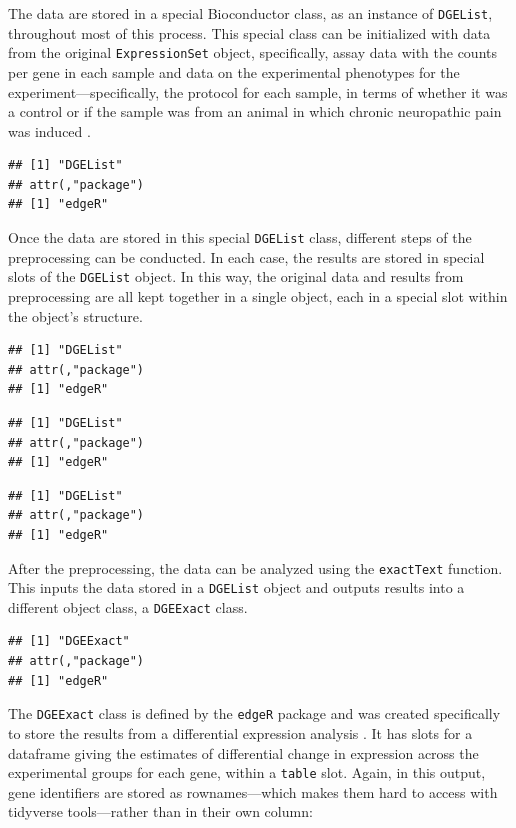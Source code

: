 \documentclass[]{tufte-book}
\begin{document}
The data are stored in a special Bioconductor class, as an instance of
\texttt{DGEList}, throughout most of this process. This special class can be initialized
with data from the original \texttt{ExpressionSet} object, specifically, assay
data with the counts per gene in each sample and data on the experimental
phenotypes for the experiment---specifically, the protocol for each sample,
in terms of whether it was a control or if the sample was from an animal
in which chronic neuropathic pain was induced \citep{hammer2010mrna}.

\begin{verbatim}
## [1] "DGEList"
## attr(,"package")
## [1] "edgeR"
\end{verbatim}

Once the data are stored in this special \texttt{DGEList} class, different
steps of the preprocessing can be conducted. In each case, the results are
stored in special slots of the \texttt{DGEList} object. In this way, the original
data and results from preprocessing are all kept together in a single
object, each in a special slot within the object's structure.

\begin{verbatim}
## [1] "DGEList"
## attr(,"package")
## [1] "edgeR"
\end{verbatim}

\begin{verbatim}
## [1] "DGEList"
## attr(,"package")
## [1] "edgeR"
\end{verbatim}

\begin{verbatim}
## [1] "DGEList"
## attr(,"package")
## [1] "edgeR"
\end{verbatim}

After the preprocessing, the data can be analyzed using the \texttt{exactText} function.
This inputs the data stored in a \texttt{DGEList} object and outputs results into
a different object class, a \texttt{DGEExact} class.

\begin{verbatim}
## [1] "DGEExact"
## attr(,"package")
## [1] "edgeR"
\end{verbatim}

The \texttt{DGEExact} class is defined by the \texttt{edgeR} package and was created
specifically to store the results from a differential expression analysis
\citep{chen2014edger}. It has slots for a dataframe giving the estimates of
differential change in expression across the experimental groups for each
gene, within a \texttt{table} slot. Again, in this output, gene identifiers are
stored as rownames---which makes them hard to access with tidyverse tools---rather
than in their own column:
\end{document}
